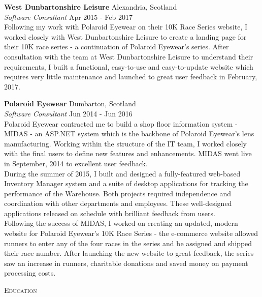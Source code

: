 \documentclass[a4paper]{article}
\newcommand{\lineunder} {
  \vspace*{-8pt} \\
  \hspace*{-18pt} \hrulefill \\
}
\newcommand{\header} [1] {
  {\hspace*{-18pt}\vspace*{6pt} \textsc{#1}}
  \vspace*{-6pt} \lineunder
}
\begin{document}
\textbf{West Dunbartonshire Leisure} \hfill {\color{gray} Alexandria, Scotland} \\
\textit{Software Consultant} \hfill {\color{gray} Apr 2015 - Feb 2017} \\
\vspace{2mm}
Following my work with Polaroid Eyewear on their 10K Race Series website, I worked closely with
West Dunbartonshire Leisure to create a landing page for their 10K race series - a continuation of
Polaroid Eyewear’s series. After consultation with the team at West Dunbartonshire Leisure to
understand their requirements, I built a functional, easy-to-use and easy-to-update website which
requires very little maintenance and launched to great user feedback in February, 2017.
\vspace{2mm}

\textbf{Polaroid Eyewear} \hfill {\color{gray} Dumbarton, Scotland} \\
\textit{Software Consultant} \hfill {\color{gray} Jun 2014 - Jun 2016} \\
\vspace{2mm}
Polaroid Eyewear contracted me to build a shop floor information system - MIDAS - an ASP.NET
system which is the backbone of Polaroid Eyewear's lens manufacturing. Working within the structure
of the IT team, I worked closely with the final users to define new features and enhancements.
MIDAS went live in September, 2014 to excellent user feedback. \\
\vspace{2mm}
During the summer of 2015, I built and designed a fully-featured web-based Inventory Manager system
and a suite of desktop applications for tracking the performance of the Warehouse. Both projects
required independence and coordination with other departments and employees. These well-designed
applications released on schedule with brilliant feedback from users. \\
\vspace{2mm}
Following the success of MIDAS, I worked on creating an updated, modern website for Polaroid
Eyewear's 10K Race Series - the e-commerce website allowed runners to enter any of the four races
in the series and be assigned and shipped their race number. After launching the new website to
great feedback, the series saw an increase in runners, charitable donations and saved money on
payment processing costs.
\vspace{2mm}

\header{Education}
\vspace{1mm}
\end{document}
